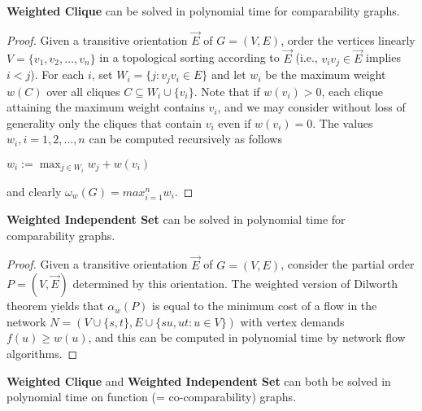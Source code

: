 \begin{thm}
	\textbf{Weighted Clique} can be solved in polynomial time for comparability graphs.
\end{thm}

\begin{proof}
	Given a transitive orientation $\overrightarrow{E}$ of $G = (V, E)$, order the vertices linearly $V = \{v_1 , v_2 , \dots, v_n\}$ in a topological sorting according to $\overrightarrow{E}$ (i.e., $v_i v_j \in \overrightarrow{E}$ implies $i < j$). For each $i$, set $W_i = \{j : v_j v_i \in E\}$ and let $w_i$ be the maximum weight $w(C)$ over all cliques $C \subseteq W_i \cup \{v_i\}$. Note that if $w(v_i) > 0$, each clique attaining the maximum weight contains $v_i$, and we may consider without loss	of generality only the cliques that contain $v_i$ even if $w(v_i) = 0$. The values $w_i , i = 1, 2, \dots , n$ can be computed recursively as follows
	
	\begin{algorithm}[!ht]
		\begin{algorithmic}[1]
				\State $w_i := \max_{j \in W_i} w_j + w(v_i)$
			\EndFor
		\end{algorithmic}
	\end{algorithm}
	
	and clearly $\omega_w(G) = max_{i=1}^n w_i$.
\end{proof}

\begin{thm}
	\textbf{Weighted Independent Set} can be solved in polynomial time for \\ comparability graphs.
\end{thm}

\begin{proof}
	Given a transitive orientation $\overrightarrow{E}$ of $G = (V, E)$, consider the partial order $P = (V, \overrightarrow{E})$ determined by this orientation. The weighted version of Dilworth theorem yields that $\alpha_w(P)$ is equal to the minimum cost of a flow in the network $N = (V \cup \{s, t\}, E \cup \{su, ut : u \in V\})$ with vertex demands $f(u) \geq w(u)$, and this can be computed in polynomial time by network flow algorithms.
\end{proof}

\begin{cor}
	\textbf{Weighted Clique} and \textbf{Weighted Independent Set} can both be solved in polynomial time on function (= co-comparability) graphs.
\end{cor}

